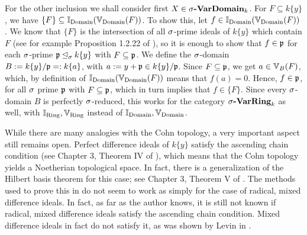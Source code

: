 \begin{prop}
\begin{bew}
For the other inclusion we shall consider first $X \in \sigma\text{{\normalfont\textbf{-VarDomain}}}_k$.
For $F \subseteq k\{y\}$, we have $\{F\} \subseteq \mathbb{I}_{\operatorname{Domain}}(\mathbb{V}_{\operatorname{Domain}}(F))$. To show this, let $f \in \mathbb{I}_{\operatorname{Domain}}(\mathbb{V}_{\operatorname{Domain}}(F))$.
We know that $\{F\}$ is the intersection of all $\sigma$-prime ideals of $k\{y\}$ which contain $F$ (see for example Proposition 1.2.22 of \cite{wibmer}), so it is enough to show that $f \in \mathfrak{p}$ for each $\sigma$-prime $\mathfrak{p} \unlhd_{\sigma} k\{y\}$ with $F \subseteq \mathfrak{p}$.
We define the $\sigma$-domain $B:= k\{y\}/\mathfrak{p} =: k\{a\}$, with $a := y + \mathfrak{p} \in k\{y\}/\mathfrak{p}$. Since $F \subseteq \mathfrak{p}$, we get $a \in \mathbb{V}_B(F)$, which, by definition of $\mathbb{I}_{\operatorname{Domain}}(\mathbb{V}_{\operatorname{Domain}}(F))$ means that $f(a) = 0$. Hence, $f \in \mathfrak{p}$, for all $\sigma$ prime $\mathfrak{p}$
with $F \subseteq \mathfrak{p}$, which in turn implies that $f \in \{F\}$. Since every $\sigma$-domain $B$ is perfectly $\sigma$-reduced, this works for the category $\sigma\text{{\normalfont\textbf{-VarRing}}}_k$ as well, with $\mathbb{I}_{\operatorname{Ring}}, \mathbb{V}_{\operatorname{Ring}}$ instead of $\mathbb{I}_{\operatorname{Domain}}, \mathbb{V}_{\operatorname{Domain}}$.
\end{bew}

\end{prop}

While there are many analogies with the Cohn topology, a very important aspect still remains open. Perfect difference ideals of $k\{y\}$ satisfy the ascending chain condition (see Chapter 3, Theorem IV of \cite{cohn}), which means that the Cohn topology yields a Noetherian topological space.
In fact, there is a generalization of the Hilbert basis theorem for this case; see Chapter 3, Theorem V of \cite{cohn}. The methods used to prove this in \cite{cohn} do not seem to work as simply for the case of radical, mixed difference ideals.
In fact, as far as the author knows, it is still not known if radical, mixed difference ideals satisfy the ascending chain condition. Mixed difference ideals in fact do not satisfy it, as was shown by Levin in \cite{levinmixed}.




